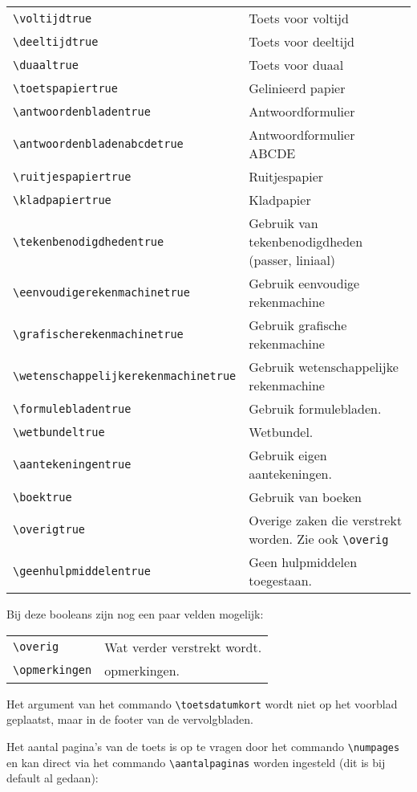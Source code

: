 \documentclass[12pt,dutch,addpoints,fleqn]{tisdexam}
\begin{document}
\begin{tabular}{lp{10cm}}
\verb|\voltijdtrue| & Toets voor voltijd \\
\verb|\deeltijdtrue| & Toets voor deeltijd \\
\verb|\duaaltrue| & Toets voor duaal \\
\verb|\toetspapiertrue| & Gelinieerd papier \\
\verb|\antwoordenbladentrue| & Antwoordformulier \\
\verb|\antwoordenbladenabcdetrue| & Antwoordformulier ABCDE \\
\verb|\ruitjespapiertrue| & Ruitjespapier \\
\verb|\kladpapiertrue| & Kladpapier \\
\verb|\tekenbenodigdhedentrue| & Gebruik van tekenbenodigdheden (passer, liniaal) \\
\verb|\eenvoudigerekenmachinetrue| & Gebruik eenvoudige rekenmachine \\ 
\verb|\grafischerekenmachinetrue| & Gebruik grafische rekenmachine \\
\verb|\wetenschappelijkerekenmachinetrue| & Gebruik wetenschappelijke rekenmachine \\
\verb|\formulebladentrue| & Gebruik formulebladen. \\
\verb|\wetbundeltrue| & Wetbundel. \\
\verb|\aantekeningentrue| & Gebruik eigen aantekeningen. \\
\verb|\boektrue| & Gebruik van boeken  \\
\verb|\overigtrue| & Overige zaken die verstrekt worden. Zie ook \verb|\overig| \\
\verb|\geenhulpmiddelentrue| & Geen hulpmiddelen toegestaan.
\end{tabular}


Bij deze booleans zijn nog een paar velden mogelijk:

\begin{tabular}{lp{15cm}}
\verb|\overig| & Wat verder verstrekt wordt. \\
\verb|\opmerkingen| & opmerkingen.
\end{tabular}

Het argument van het commando \verb|\toetsdatumkort| wordt niet op het voorblad
geplaatst, maar in de footer van de vervolgbladen.

Het aantal pagina's van de toets is op te vragen door het commando \verb|\numpages| en
kan direct via het commando \verb|\aantalpaginas| worden ingesteld (dit is bij default
al gedaan):
\end{document}
